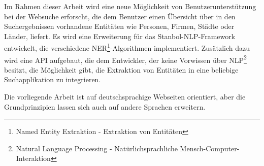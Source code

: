 Im Rahmen dieser Arbeit wird eine neue Möglichkeit von Benutzerunterstützung bei der Websuche erforscht, die dem Benutzer einen Übersicht über in den Suchergebnissen vorhandene Entitäten wie Personen, Firmen, Städte oder Länder, liefert. Es wird eine Erweiterung für das Stanbol-NLP-Framework entwickelt, die verschiedene NER\footnote{Named Entity Extraktion - Extraktion von Entitäten}-Algorithmen implementiert. Zusätzlich dazu wird eine API aufgebaut, die dem Entwickler, der keine Vorwissen über NLP\footnote{Natural Language Processing - Natürlichsprachliche Mensch-Computer-Interaktion} besitzt, die Möglichkeit gibt, die Extraktion von Entitäten in eine beliebige Suchapplikation zu integrieren. 

Die vorliegende Arbeit ist auf deutschsprachige Webseiten orientiert, aber die Grundprinzipien lassen sich auch auf andere Sprachen erweitern.